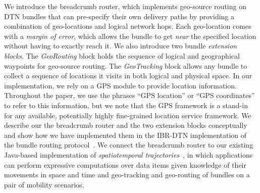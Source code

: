We introduce the {\sc breadcrumb} router, which implements geo-source routing on DTN bundles that can pre-specify their own delivery paths by providing a combination of geo-locations and logical network hops. 
Each geo-location comes with a {\em margin of error}, which allows the bundle to get {\em near} the specified location without having to exactly reach it. We also introduce two bundle {\em extension blocks}. The {\em GeoRouting} block holds the sequence of logical and geographical waypoints for geo-source routing. The {\em GeoTracking} block allows any bundle to collect a sequence of locations it visits in both logical and physical space. In our implementation, we rely on a GPS module to provide location information. Throughout the paper, we use the phrases ``GPS location'' or ``GPS coordinates'' to refer to this information, but we note that the GPS framework is a stand-in for any available, potentially highly fine-grained location service framework.  We describe our the {\sc breadcrumb} router and the two extension blocks conceptually and show how we have implemented them in the IBR-DTN implementation of the bundle routing protocol~\cite{IBR-DTN-WASA}. We connect the {\sc breadcrumb} router to our existing Java-based implementation of {\em spatiotemporal trajectories}~\cite{michel12:spatiotemporal}, in which applications can perform expressive computations over data items given knowledge of their movements in space and time and geo-tracking and geo-routing of bundles on a pair of mobility scenarios.





